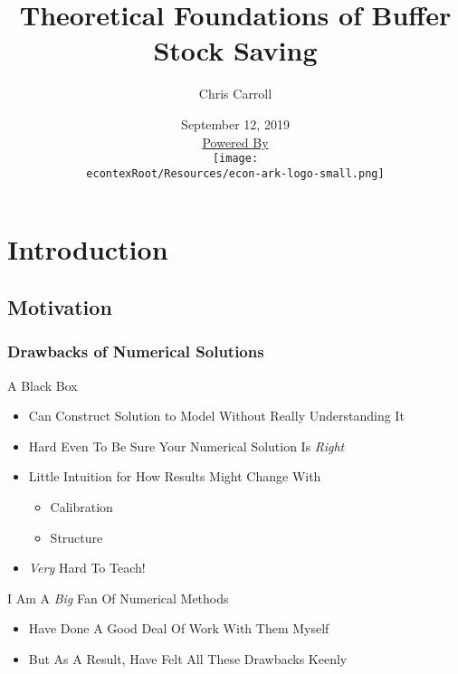 \documentclass[pdflatex]{beamer}
\title[Buffer Stock Theory]{Theoretical Foundations of Buffer Stock Saving}
\author[Carroll]{Chris Carroll}
\institute[JHU]{Johns Hopkins University}
\date[\today]{September 12, 2019  \\ \medskip \medskip \medskip \href{https://econ-ark.org/}{\small Powered By} \\ \texttt{[image: \\econtexRoot/Resources/econ-ark-logo-small.png]}}
\begin{document}


\begin{frame}[plain]
  \titlepage
\end{frame}


\section{Introduction}
\subsection{Motivation}

\begin{frame}
\frametitle{Drawbacks of Numerical Solutions}


\pause A Black Box \pause
\begin{itemize}
\item Can Construct Solution to Model Without Really Understanding It
\item Hard Even To Be Sure Your Numerical Solution Is {\it Right}
\item Little Intuition for How Results Might Change With
\begin{itemize}
\item Calibration
\item Structure
\end{itemize}
\item {\it Very} Hard To Teach!
\end{itemize}

\medskip\medskip
\pause I Am A {\it Big} Fan Of Numerical Methods
\begin{itemize}
\item Have Done A Good Deal Of Work With Them Myself
\item But As A Result, Have Felt All These Drawbacks Keenly
\end{itemize}



\end{frame}
\end{document}

